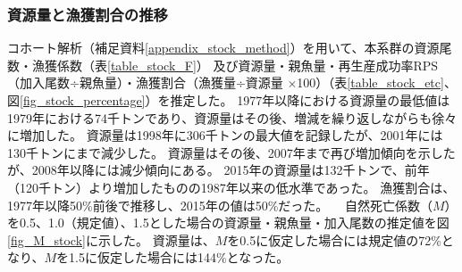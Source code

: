 \subsubsection{資源量と漁獲割合の推移}
コホート解析（補足資料\ref{appendix_stock_method}）を用いて、本系群の資源尾数・漁獲係数（表\ref{table_stock_F}）
及び資源量・親魚量・再生産成功率RPS（加入尾数÷親魚量）・漁獲割合（漁獲量÷資源量 $\times$100）（表\ref{table_stock_etc}、図\ref{fig_stock_percentage}）を推定した。
1977年以降における資源量の最低値は1979年における74千トンであり、資源量はその後、増減を繰り返しながらも徐々に増加した。
資源量は1998年に306千トンの最大値を記録したが、2001年には130千トンにまで減少した。
資源量はその後、2007年まで再び増加傾向を示したが、2008年以降には減少傾向にある。
2015年の資源量は132千トンで、前年（120千トン）より増加したものの1987年以来の低水準であった。
漁獲割合は、1977年以降50\%前後で推移し、2015年の値は50\%だった。
　自然死亡係数（$M$）を0.5、1.0（規定値）、1.5とした場合の資源量・親魚量・加入尾数の推定値を図\ref{fig_M_stock}に示した。
資源量は、$M$を0.5に仮定した場合には規定値の72\%となり、$M$を1.5に仮定した場合には144\%となった。
